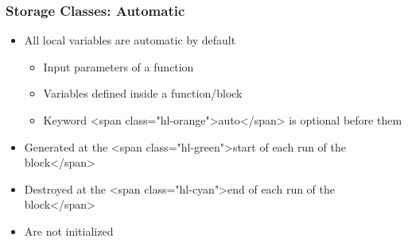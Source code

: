 \documentclass{../c-lecture}
\begin{document}
\begin{frame}
  \frametitle{Storage Classes: Automatic}
  \begin{itemize}
    \item All local variables are automatic by default
    \begin{itemize}
      \item Input parameters of a function
      \item Variables defined inside a function/block
      \item
        Keyword <span class="hl-orange">auto</span> is optional before them

    \end{itemize}
    \item
      Generated at the
      <span class="hl-green">start of each run of the block</span>

    \item
      Destroyed at the
      <span class="hl-cyan">end of each run of the block</span>

    \item Are not initialized
  \end{itemize}
\end{frame}
\end{document}
